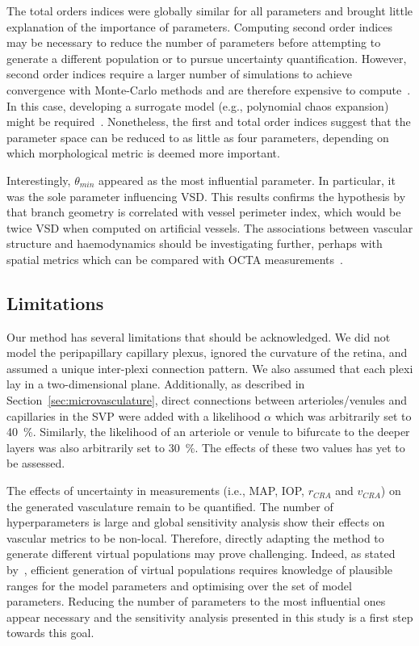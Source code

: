 \documentclass[11pt,]{article}
\begin{document}
The total orders indices were globally similar for all parameters and brought little explanation of the importance of parameters.
Computing second order indices may be necessary to reduce the number of parameters before attempting to generate a different population or to pursue uncertainty quantification.
However, second order indices require a larger number of simulations to achieve convergence with Monte-Carlo methods and are therefore expensive to compute~\cite{Saltelli2008}.
In this case, developing a surrogate model (e.g., polynomial chaos expansion) might be required~\cite{Saltelli2008}.
Nonetheless, the first and total order indices suggest that the parameter space can be reduced to as little as four parameters, depending on which morphological metric is deemed more important.

Interestingly, $\theta_{min}$ appeared as the most influential parameter.
In particular, it was the sole parameter influencing VSD.
This results confirms the hypothesis by \cite{Yao_2020} that branch geometry is correlated with vessel perimeter index, which would be twice VSD when computed on artificial vessels.
The associations between vascular structure and haemodynamics should be investigating further, perhaps with spatial metrics which can be compared with OCTA measurements~\cite{Yao_2020}.

\subsection{Limitations}\label{sec:disc-limitations}

Our method has several limitations that should be acknowledged.
We did not model the peripapillary capillary plexus, ignored the curvature of the retina, and assumed a unique inter-plexi connection pattern.
We also assumed that each plexi lay in a two-dimensional plane.
Additionally, as described in Section~\ref{sec:microvasculature}, direct connections between arterioles/venules and capillaries in the SVP were added with a likelihood $\alpha$ which was arbitrarily set to \SI{40}{\percent}.
Similarly, the likelihood of an arteriole or venule to bifurcate to the deeper layers was also arbitrarily set to \SI{30}{\percent}.
The effects of these two values has yet to be assessed.

The effects of uncertainty in measurements (i.e., MAP, IOP, $r_{CRA}$ and $v_{CRA}$) on the generated vasculature remain to be quantified.
The number of hyperparameters is large and global sensitivity analysis show their effects on vascular metrics to be non-local.
Therefore, directly adapting the method to generate different virtual populations may prove challenging.
Indeed, as stated by~\cite{Allen_2016}, efficient generation of virtual populations requires knowledge of plausible ranges for the model parameters and optimising over the set of model parameters.
Reducing the number of parameters to the most influential ones appear necessary and the sensitivity analysis presented in this study is a first step towards this goal.
\end{document}
